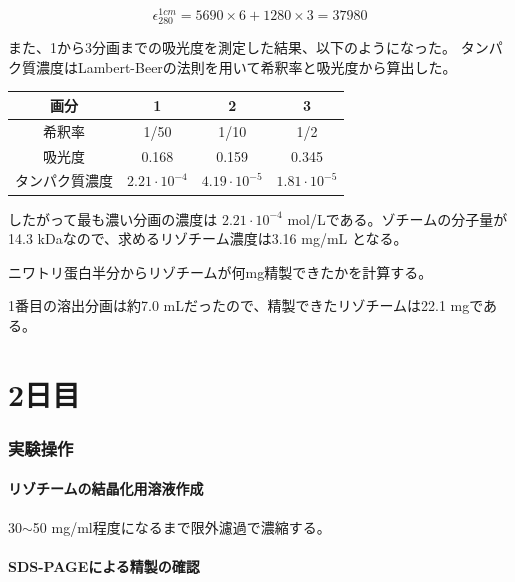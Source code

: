 \documentclass[a4paper,papersize,dvipdfmx]{jsarticle}
\begin{document}
\[\epsilon_{280}^{1cm}=5690 \times6+1280 \times 3 = 37980\]

また、1から3分画までの吸光度を測定した結果、以下のようになった。
タンパク質濃度はLambert-Beerの法則を用いて希釈率と吸光度から算出した。

\begin{table}[H]
\begin{center}
\begin{tabular}{|c|c|c|c|}
\hline
画分  & 1     & 2     & 3     \\ \hline
希釈率  & 1/50     & 1/10     & 1/2     \\ \hline
吸光度 & 0.168 & 0.159 & 0.345 \\ \hline
タンパク質濃度 & $2.21 \cdot 10^{-4}$& $4.19 \cdot 10^{-5}$&$1.81 \cdot 10^{-5}$ \\ \hline
\end{tabular}
\end{center}
\end{table}

したがって最も濃い分画の濃度は $2.21 \cdot 10^{-4}$ mol/Lである。ゾチームの分子量が14.3 kDaなので、求めるリゾチーム濃度は3.16 mg/mL となる。

\begin{tcolorbox}[colback=white,colbacktitle=black,coltitle=white,title={2.}]
ニワトリ蛋白半分からリゾチームが何mg精製できたかを計算する。
\end{tcolorbox}

1番目の溶出分画は約7.0 mLだったので、精製できたリゾチームは22.1 mgである。

\part*{2日目}

\section*{実験操作}

\subsection*{リゾチームの結晶化用溶液作成}

30$\sim$50 mg/ml程度になるまで限外濾過で濃縮する。


\subsection*{SDS-PAGEによる精製の確認}
\end{document}
